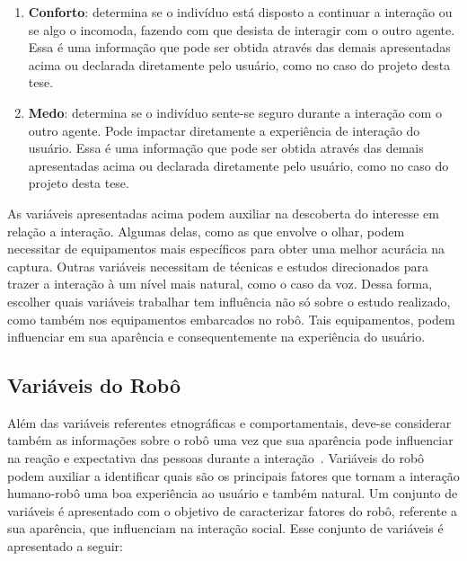 \begin{enumerate}
    \item \textbf{Conforto}: determina se o indivíduo está disposto a continuar a interação ou se algo o incomoda, fazendo com que desista de interagir com o outro agente. Essa é uma informação que pode ser obtida através das demais apresentadas acima ou declarada diretamente pelo usuário, como no caso do projeto desta tese.
    \item \textbf{Medo}: determina se o indivíduo sente-se seguro durante a interação com o outro agente. Pode impactar diretamente a experiência de interação do usuário. Essa é uma informação que pode ser obtida através das demais apresentadas acima ou declarada diretamente pelo usuário, como no caso do projeto desta tese.
\end{enumerate}

As variáveis apresentadas acima podem auxiliar na descoberta do interesse em relação a interação. Algumas delas, como as que envolve o olhar, podem necessitar de equipamentos mais específicos para obter uma melhor acurácia na captura. Outras variáveis necessitam de técnicas e estudos direcionados para trazer a interação à um nível mais natural, como o caso da voz. Dessa forma, escolher quais variáveis trabalhar tem influência não só sobre o estudo realizado, como também nos equipamentos embarcados no robô. Tais equipamentos, podem influenciar em sua aparência e consequentemente na experiência do usuário.

\subsection{Variáveis do Robô}
\label{sec:variaveisrobo}
Além das variáveis referentes etnográficas e comportamentais, deve-se considerar também as informações sobre o robô uma vez que sua aparência pode influenciar na reação e expectativa das pessoas durante a interação~\cite{hegel:2009}. Variáveis do robô podem auxiliar a identificar quais são os principais fatores que tornam a interação humano-robô uma boa experiência ao usuário e também natural. Um conjunto de variáveis é apresentado com o objetivo de caracterizar fatores do robô, referente a sua aparência, que influenciam na interação social. Esse conjunto de variáveis é apresentado a seguir:

